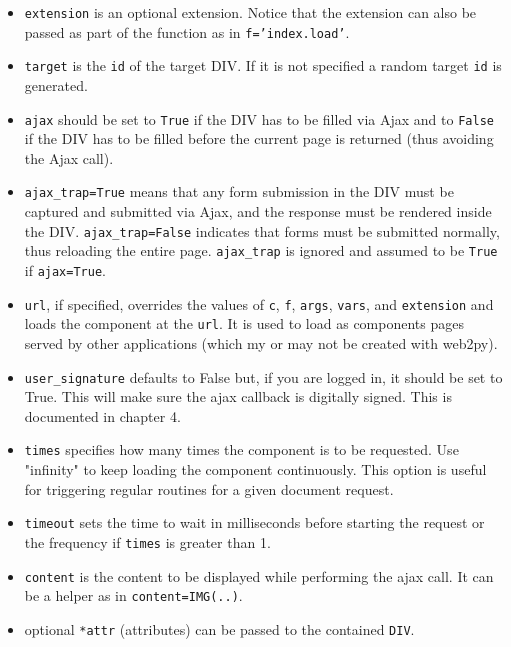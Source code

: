 \documentclass[justified,sixbynine,notoc]{tufte-book}
\def\ft{\small\tt}
\begin{document}
\begin{fullwidth}
\begin{itemize}
\item {\ft extension} is an optional extension. Notice that the extension can also be passed as part of the function as in {\ft f='index.load'}.

\item {\ft target} is the {\ft id} of the target DIV. If it is not specified a random target {\ft id} is generated.

\item {\ft ajax} should be set to {\ft True} if the DIV has to be filled via Ajax and to {\ft False} if the DIV has to be filled before the current page is returned (thus avoiding the Ajax call).

\item {\ft ajax\_trap=True} means that any form submission in the DIV must be captured and submitted via Ajax, and the response must be rendered inside the DIV. {\ft ajax\_trap=False} indicates that forms must be submitted normally, thus reloading the entire page. {\ft ajax\_trap} is ignored and assumed to be {\ft True} if {\ft ajax=True}.

\item {\ft url}, if specified, overrides the values of {\ft c}, {\ft f}, {\ft args}, {\ft vars}, and {\ft extension} and loads the component at the {\ft url}. It is used to load as components pages served by other applications (which my or may not be created with web2py).

\item {\ft user\_signature} defaults to False but, if you are logged in, it should be set to True. This will make sure the ajax callback is digitally signed. This is documented in chapter 4.

\item {\ft times} specifies how many times the component is to be requested. Use "infinity" to keep loading the component continuously. This option is useful for triggering regular routines for a given document request.

\item {\ft timeout} sets the time to wait in milliseconds before starting the request or the frequency if {\ft times} is greater than 1.

\item {\ft content} is the content to be displayed while performing the ajax call. It can be a helper as in {\ft content=IMG(..)}.

\item optional {\ft **attr} (attributes) can be passed to the contained {\ft DIV}.
\end{itemize}


\end{fullwidth}
\end{document}
